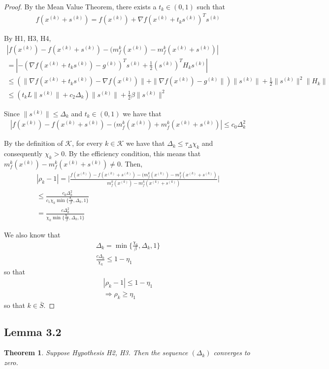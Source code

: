 \documentclass{article}
\newtheorem{theorem}{Theorem}
\newcommand{\grad}{\nabla f}
\newcommand{\xk}{{x}^{(k)}}
\newcommand{\dk}{\Delta_k}
\newcommand{\rk}{\rho_k}
\newcommand{\pik}{\chi_k}
\newcommand{\sk}{{s^{(k)}}}
\newcommand{\mk}{{m_f^{k}}}
\newcommand{\gk}{{g^{(k)}}}
\newcommand{\oalpha}{\tau_{\Delta}}
\begin{document}
\begin{proof}

By the Mean Value Theorem, there exists a $t_k \in (0, 1)$ such that
\begin{align*}
f(\xk + \sk) = f(\xk) + \grad(\xk + t_k\sk)^T\sk
\end{align*}

By H1, H3, H4,
\begin{align*}
|f(\xk) - f(\xk + \sk) - (\mk(\xk) - \mk(\xk + \sk)| \\
= |-(\grad(\xk + t_k\sk) - \gk)^T\sk + \frac 1 2 (\sk)^T H_k \sk| \\
\le (\| \grad(\xk + t_k\sk) - \grad(\xk) \| + \| \grad(\xk)-\gk \|) \|\sk\| + \frac 1 2 \|\sk\|^2\|H_k\| \\
\le (t_k L \|\sk\| + c_2\dk) \|\sk\| + \frac 1 2 \beta \|\sk\|^2
\end{align*}

Since $\| \sk \| \le \dk$ and $t_k \in (0, 1)$ we have that
\begin{align}
|f(\xk) - f(\xk + \sk) - (\mk(\xk) + \mk(\xk + \sk)| \le c_0 \dk^2
\end{align}

By the definition of $\mathcal K$, for every $k \in \mathcal K$ we have that $\dk \le \oalpha \pik$ and consequently $\pik > 0$.
By the efficiency condition, this means that $\mk(\xk) - \mk(\xk + \sk) \ne 0$.
Then,
\begin{align*}
|\rk - 1| = \bigg |\frac{f(\xk) - f(\xk + \sk) - (\mk(\xk) - \mk(\xk + \sk)}{\mk(\xk) - \mk(\xk + \sk)} \bigg | \\
\le \frac {c_0 \dk^2} {c_1 \pik \min\{\frac{\pik}{\beta}, \dk, 1\}} \\
= \frac {c \dk^2} {\pik \min\{\frac{\pik}{\beta}, \dk, 1\}}
\end{align*}

We also know that 
\begin{align*}
\dk = \min\{\frac {\pik} {\beta}, \dk, 1 \} \\
\frac {c \dk}{\pik} \le 1 - \eta_1
\end{align*}
so that
\begin{align*}
|\rk - 1| \le 1 - \eta_1 \\
\Longrightarrow \rk \ge \eta_1
\end{align*}
so that $k \in \bar{S}$.


\end{proof}



\subsection{Lemma 3.2}
\begin{theorem}
Suppose Hypothesis H2, H3. Then the sequence $(\dk)$ converges to zero.
\end{theorem}
 
\end{document}
